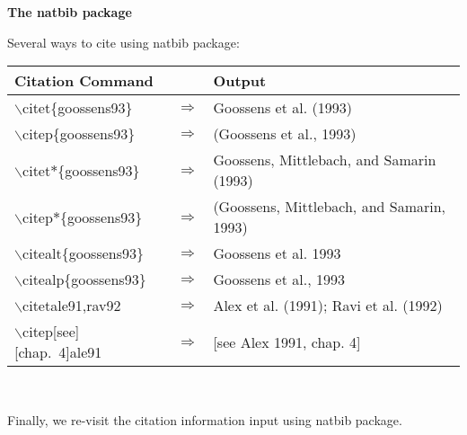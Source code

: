 \begin{frame}[t,fragile]{\textbf{\textbf{The natbib package}}}


Several ways to cite using natbib package:\\
\vspace{0.3cm}


\small
\begin{tabular}{lcl}
\hline\rowcolor{gray!10}
\textbf{Citation Command} &  & \textbf{Output}  \\
\hline
 \rowcolor{almond}
$\backslash$citet\{goossens93\} & $\Rightarrow$ & Goossens et al. (1993)  \\

\rowcolor{ablue}
$\backslash$citep\{goossens93\} & $\Rightarrow$ & (Goossens et al., 1993)   \\

 \rowcolor{almond}
$\backslash$citet$\ast$\{goossens93\} & $\Rightarrow$ & Goossens, Mittlebach, and Samarin (1993) \\ 
 
\rowcolor{ablue}
$\backslash$citep$\ast$\{goossens93\} & $\Rightarrow$ & (Goossens, Mittlebach, and Samarin, 1993) \\ 

\rowcolor{almond}
$\backslash$citealt\{goossens93\} & $\Rightarrow$ & Goossens et al. 1993   \\

\rowcolor{ablue}
$\backslash$citealp\{goossens93\} & $\Rightarrow$ & Goossens et al., 1993   \\
 
\rowcolor{almond}
$\backslash$citet{ale91,rav92} & $\Rightarrow$ & Alex et al. (1991); Ravi et al. (1992)   \\ 

\rowcolor{ablue}
$\backslash$citep[see][chap.~4]{ale91} & $\Rightarrow$ & [see Alex 1991, chap. 4]  \\\hline
\end{tabular}\\
\vspace{0.3cm}

Finally, we re-visit the citation information input using natbib package.


\end{frame}


